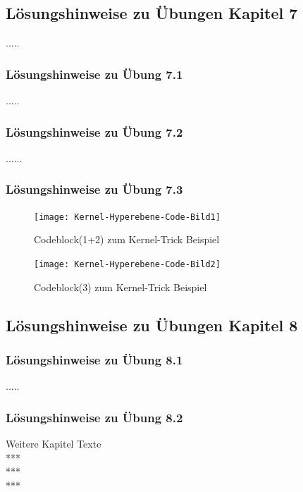 \documentclass[12pt]{article}
\begin{document}
\newpage

\subsection{Lösungshinweise zu Übungen Kapitel 7}
.....\\
\subsubsection{Lösungshinweise zu Übung 7.1}
.....\\
\subsubsection{Lösungshinweise zu Übung 7.2} 
...... \\[0.8cm]
\subsubsection{Lösungshinweise zu Übung 7.3}

\begin{figure}[htp]
  \centering
  \hspace*{-0.5cm} 
  \texttt{[image: Kernel-Hyperebene-Code-Bild1]}
  \caption{Codeblock(1+2) zum Kernel-Trick Beispiel}
  \label{fig:SVM_Ebenen}
\end{figure}

\begin{figure}[htp]
  \centering
  \hspace*{-0.5cm} 
  \texttt{[image: Kernel-Hyperebene-Code-Bild2]}
  \caption{Codeblock(3) zum Kernel-Trick Beispiel}
  \label{fig:SVM_Ebenen}
\end{figure}

\newpage

\subsection{Lösungshinweise zu Übungen Kapitel 8}

\subsubsection{Lösungshinweise zu Übung 8.1}
.....\\
\subsubsection{Lösungshinweise zu Übung 8.2}
Weitere Kapitel Texte \\
***\\
***\\
***
\end{document}
